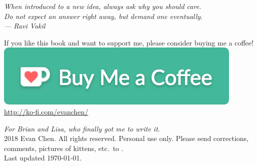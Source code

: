 \begin{titlepage}
	\vspace*{3cm}
	\begin{flushright}
		\large\itshape
		When introduced to a new idea, always ask why you should care. \\[0.2cm]
		Do not expect an answer right away, but demand one eventually. \\[0.8cm]
		--- Ravi Vakil \cite{ref:vakil}
	\end{flushright}

	\vspace*{8em}
	\hrulebar

	\begin{center}
	\begin{minipage}{50ex}
		\centering
		If you like this book and want to support me,
		please consider buying me a coffee! \\[2ex]
		\href{http://ko-fi.com/evanchen}{\includegraphics[width=32ex]{media/kofi4.png}} \\
		\url{http://ko-fi.com/evanchen/}
	\end{minipage}
	\end{center}
	
	\vfill
	{
	\small
	\noindent \emph{For Brian and Lisa, who finally got me to write it}. \\[0.4cm]
	\noindent {\copyright} 2018 Evan Chen.
	All rights reserved. Personal use only.
	Please send corrections, comments, pictures of kittens,
	etc.\ to . \\[0.4cm]
	\noindent Last updated \today.
	\vspace*{1cm}
	}
\end{titlepage}
